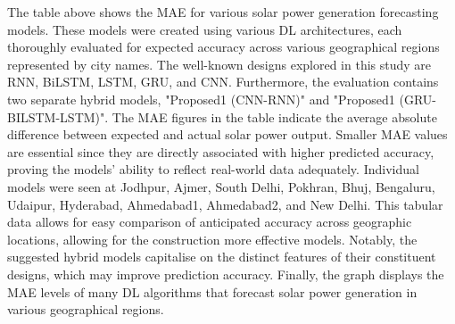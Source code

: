 \documentclass[a4paper,fleqn]{cas-sc}
\begin{document}
The table above shows the MAE for various solar power generation forecasting models. These models were created using various DL architectures, each thoroughly evaluated for expected accuracy across various geographical regions represented by city names. The well-known designs explored in this study are RNN, BiLSTM, LSTM, GRU, and CNN. Furthermore, the evaluation contains two separate hybrid models, "Proposed1 (CNN-RNN)" and "Proposed1 (GRU-BILSTM-LSTM)". The MAE figures in the table indicate the average absolute difference between expected and actual solar power output. Smaller MAE values are essential since they are directly associated with higher predicted accuracy, proving the models' ability to reflect real-world data adequately. Individual models were seen at Jodhpur, Ajmer, South Delhi, Pokhran, Bhuj, Bengaluru, Udaipur, Hyderabad, Ahmedabad1, Ahmedabad2, and New Delhi. This tabular data allows for easy comparison of anticipated accuracy across geographic locations, allowing for the construction more effective models. Notably, the suggested hybrid models capitalise on the distinct features of their constituent designs, which may improve prediction accuracy. Finally, the graph displays the MAE levels of many DL algorithms that forecast solar power generation in various geographical regions.
\end{document}
